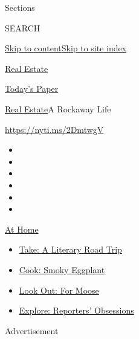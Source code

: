 Sections

SEARCH

\protect\hyperlink{site-content}{Skip to
content}\protect\hyperlink{site-index}{Skip to site index}

\href{https://www.nytimes.com/section/realestate}{Real Estate}

\href{https://myaccount.nytimes.com/auth/login?response_type=cookie\&client_id=vi}{}

\href{https://www.nytimes.com/section/todayspaper}{Today's Paper}

\href{/section/realestate}{Real Estate}\textbar{}A Rockaway Life

\url{https://nyti.ms/2DmtwgV}

\begin{itemize}
\item
\item
\item
\item
\item
\item
\end{itemize}

\href{https://www.nytimes.com/spotlight/at-home?action=click\&pgtype=Article\&state=default\&region=TOP_BANNER\&context=at_home_menu}{At
Home}

\begin{itemize}
\tightlist
\item
  \href{https://www.nytimes.com/2020/07/28/books/time-for-a-literary-road-trip.html?action=click\&pgtype=Article\&state=default\&region=TOP_BANNER\&context=at_home_menu}{Take:
  A Literary Road Trip}
\item
  \href{https://www.nytimes.com/2020/07/29/magazine/bored-with-your-home-cooking-some-smoky-eggplant-will-fix-that.html?action=click\&pgtype=Article\&state=default\&region=TOP_BANNER\&context=at_home_menu}{Cook:
  Smoky Eggplant}
\item
  \href{https://www.nytimes.com/2020/07/27/travel/moose-michigan-isle-royale.html?action=click\&pgtype=Article\&state=default\&region=TOP_BANNER\&context=at_home_menu}{Look
  Out: For Moose}
\item
  \href{https://www.nytimes.com/interactive/2020/at-home/even-more-reporters-editors-diaries-lists-recommendations.html?action=click\&pgtype=Article\&state=default\&region=TOP_BANNER\&context=at_home_menu}{Explore:
  Reporters' Obsessions}
\end{itemize}

Advertisement

